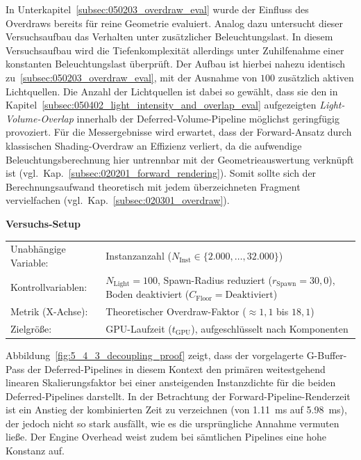 In Unterkapitel~\ref{subsec:050203_overdraw_eval} wurde der Einfluss des Overdraws bereits für reine Geometrie
evaluiert.
Analog dazu untersucht dieser Versuchsaufbau das Verhalten unter zusätzlicher Beleuchtungslast.
In diesem Versuchsaufbau wird die Tiefenkomplexität allerdings unter Zuhilfenahme einer konstanten Beleuchtungslast
überprüft.
Der Aufbau ist hierbei nahezu identisch zu~\ref{subsec:050203_overdraw_eval}, mit der Ausnahme von $100$
zusätzlich aktiven Lichtquellen.
Die Anzahl der Lichtquellen ist dabei so gewählt, dass sie den in
Kapitel~\ref{subsec:050402_light_intensity_and_overlap_eval} aufgezeigten \textit{Light-Volume-Overlap} innerhalb der
Deferred-Volume-Pipeline möglichst geringfügig provoziert.
Für die Messergebnisse wird erwartet, dass der Forward-Ansatz durch klassischen Shading-Overdraw an Effizienz verliert,
da die aufwendige Beleuchtungsberechnung hier untrennbar mit der Geometrieauswertung verknüpft ist
(vgl.\ Kap.~\ref{subsec:020201_forward_rendering}).
Somit sollte sich der Berechnungsaufwand theoretisch mit jedem überzeichneten Fragment vervielfachen
(vgl.\ Kap.~\ref{subsec:020301_overdraw}).

\begin{center}
    \small
    \colorbox{gray!5}{\parbox{0.95\textwidth}{
        \centering
        \vspace{2mm}
        {\sffamily\bfseries Versuchs-Setup} \\[1.5ex]
        \begin{tabularx}{0.9\textwidth}{>{\sffamily}l X}
            Unabhängige Variable:    & Instanzanzahl ($N_{\text{Inst}} \in \{2.000, \dots, 32.000\}$) \\
            Kontrollvariablen:       & $N_{\text{Light}} = 100$, Spawn-Radius reduziert ($r_{\text{Spawn}} = 30{,}0$),
            Boden deaktiviert ($C_{\text{Floor}} = \text{Deaktiviert}$) \\
            Metrik (X-Achse):        & Theoretischer Overdraw-Faktor ($\approx 1{,}1$ bis $18{,}1$) \\
            Zielgröße:               & \ac{GPU}-Laufzeit ($t_{\text{GPU}}$), aufgeschlüsselt nach Komponenten
        \end{tabularx}
        \vspace{2mm}
    }}
\end{center}

Abbildung~\ref{fig:5_4_3_decoupling_proof} zeigt, dass der vorgelagerte \ac{G-Buffer}-Pass der Deferred-Pipelines in
diesem Kontext den primären weitestgehend linearen Skalierungsfaktor bei einer ansteigenden Instanzdichte für die beiden
Deferred-Pipelines darstellt.
In der Betrachtung der Forward-Pipeline-Renderzeit ist ein Anstieg der kombinierten Zeit zu verzeichnen
(von \qty{1,11}{\milli\second} auf \qty{5,98}{\milli\second}), der jedoch nicht so stark ausfällt, wie es die
ursprüngliche Annahme vermuten ließe.
Der Engine Overhead weist zudem bei sämtlichen Pipelines eine hohe Konstanz auf.

